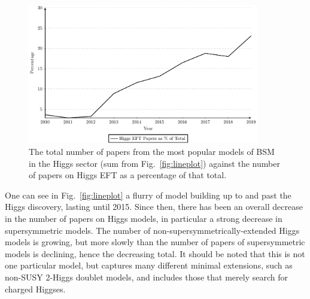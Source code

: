 \begin{figure}
\includegraphics[width=0.9\textwidth]{percenttotal_eft_2107}
\caption{The total number of papers from the most popular models of BSM in the Higgs sector (sum from Fig.~\ref{fig:lineplot}) against the number of papers on Higgs EFT as a percentage of that total.}
\label{fig:percent}
\end{figure}


One can see in Fig.~\ref{fig:lineplot} a flurry of model building up to and past the Higgs discovery, lasting until 2015. 
Since then, there has been an overall decrease in the number of papers on Higgs models, in particular a strong decrease in supersymmetric models. 
The number of non-supersymmetrically-extended Higgs models is growing, but more slowly than the number of papers of supersymmetric models is declining, hence the decreasing total. 
It should be noted that this is not one particular model, but captures many different minimal extensions, such as non-SUSY 2-Higgs doublet models, and includes those that merely search for charged Higgses.

